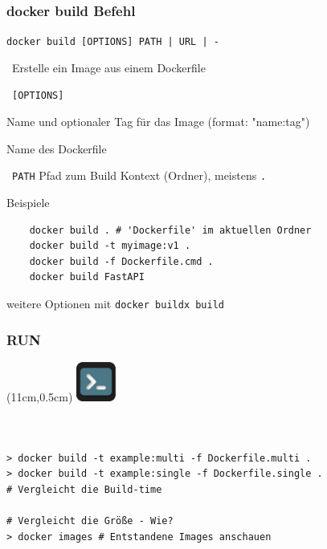 \documentclass[22pt]{beamer}
\newcommand{\code}[1]{\colorbox{gray!15}{\texttt{#1}}}
\newcommand{\desclabel}[1]{\textcolor{cyan}{#1}}
\newcommand{\terminal}{
    \begin{textblock*}{1.3cm}(11cm,0.5cm) %
    \includegraphics[width=1.3cm]{Bilder/terminal2.png}
    \end{textblock*}
}
\begin{document}
\begin{frame}[fragile]
    \frametitle{docker build Befehl}
    \code{docker build [OPTIONS] PATH | URL | -} 
    
    \-  \ Erstelle ein Image aus einem Dockerfile\vspace{5pt}
    
    \-  \  \code{[OPTIONS]}
    \begin{description}[labelindent=0.5cm, style=unboxed, labelwidth=\widthof{-f, -\,-file string}, leftmargin=!]
        \item[\desclabel{-t, -\,-tag stringArray}] Name und optionaler Tag für das Image (format: "name:tag")
        \item[\desclabel{-f, -\,-file string}] Name des Dockerfile
        \item[...] 
    \end{description}
    
    \-  \ \code{PATH} Pfad zum Build Kontext (Ordner), meistens \code{.}
    \pause
    
    Beispiele
    \begin{verbatim}
    docker build . # 'Dockerfile' im aktuellen Ordner
    docker build -t myimage:v1 . 
    docker build -f Dockerfile.cmd . 
    docker build FastAPI
    \end{verbatim}
    \medskip

    {\small weitere Optionen mit \code{docker buildx build}}
\end{frame}

\begin{frame}[fragile, b]
    \frametitle{RUN}
    \terminal
    \begin{columns}
        \begin{column}{0.5\textwidth}
            \inputminted[fontsize=\scriptsize, frame=lines]{dockerfile}{../examples/Dockerfile.multi}
        \end{column}
        \begin{column}{0.5\textwidth}
            \inputminted[fontsize=\scriptsize, frame=lines]{dockerfile}{../examples/Dockerfile.single}
        \end{column}
    \end{columns}
    \medskip\pause
\begin{verbatim}
> docker build -t example:multi -f Dockerfile.multi .
> docker build -t example:single -f Dockerfile.single .
# Vergleicht die Build-time

# Vergleicht die Größe - Wie?
> docker images # Entstandene Images anschauen

\end{verbatim}
\end{frame}
\end{document}

